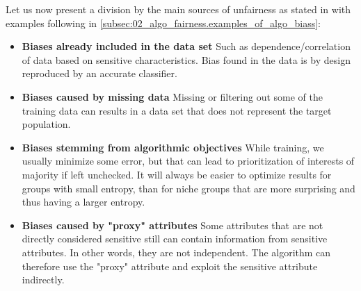 \newline
Let us now present a division by the main sources of unfairness as stated in \cite{pessach2020algorithmic_fairness} with examples following in \ref{subsec:02_algo_fairness.examples_of_algo_biass}:
\begin{itemize}
    \item \textbf{Biases already included in the data set}\newline
    Such as dependence/correlation of data based on sensitive characteristics. Bias found in the data is by design reproduced by an accurate classifier.
    \item \textbf{Biases caused by missing data}\newline
    Missing or filtering out some of the training data can results in a data set that does not represent the target population.
    \item \textbf{Biases stemming from algorithmic objectives}\newline
    While training, we usually minimize some error, but that can lead to prioritization of interests of majority if left unchecked. It will always be easier to optimize results for groups with small entropy, than for niche groups that are more surprising and thus having a larger entropy.
    \item \textbf{Biases caused by "proxy" attributes}\newline
    Some attributes that are not directly considered sensitive still can contain information from sensitive attributes. In other words, they are not independent. The algorithm can therefore use the "proxy" attribute and exploit the sensitive attribute indirectly.
\end{itemize}



